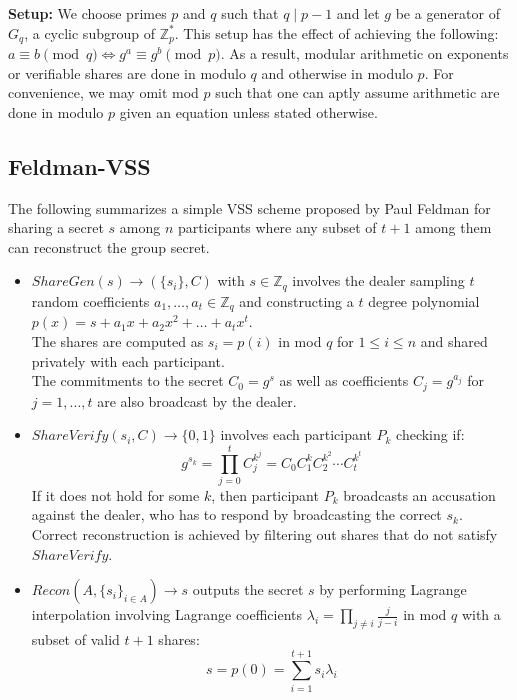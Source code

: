 \documentclass[letterpaper,twocolumn,10pt]{article}
\theoremstyle{definition}
\theoremstyle{remark}
\begin{document}
\textbf{Setup:} We choose primes $p$ and $q$ such that $q \mid p - 1$ and let $g$ be a generator of $G_q$, a cyclic subgroup of $\mathbb{Z}^*_p$. This setup has the effect of achieving the following: $a \equiv b \pmod q \iff g^a \equiv g^b \pmod p$. As a result, modular arithmetic on exponents or verifiable shares are done in modulo $q$ and otherwise in modulo $p$. For convenience, we may omit mod $p$ such that one can aptly assume arithmetic are done in modulo $p$ given an equation unless stated otherwise.
\subsection{Feldman-VSS}
\label{appendix:feldmanVSS}
The following summarizes a simple VSS scheme proposed by Paul Feldman for sharing a secret $s$ among $n$ participants where any subset of $t+1$ among them can reconstruct the group secret.
\begin{itemize}
    \item $ShareGen(s) \rightarrow (\{s_i\}, C)$ with $s \in \mathbb{Z}_q$ involves the dealer sampling $t$ random coefficients $a_1, \ldots, a_t \in \mathbb{Z}_q$ and constructing a $t$ degree polynomial $p(x) = s + a_1x+ a_2x^2 +\ldots+a_tx^t$.\\
    The shares are computed as $s_i = p(i)$ in mod $q$ for $1\le i \le n$ and shared privately with each participant.\\
    The commitments to the secret $C_0 = g^s$ as well as coefficients $C_j = g^{a_j}$ for $j = 1,\ldots,t$ are also broadcast by the dealer.
    
    \item $ShareVerify(s_i, C) \rightarrow \{0, 1\}$ involves each participant $P_k$  checking if:
    $$g^{s_k} = \prod_{j = 0}^{t } C_j^{k^j} = C_0 C_1^k C_2^{k^2} \cdots C_{t }^{k^{t }}$$
     If it does not hold for some $k$, then participant $P_k$ broadcasts an accusation against the dealer, who has to respond by broadcasting the correct $s_k$. \\
     Correct reconstruction is achieved by filtering out shares that do not satisfy $ShareVerify$.
    \item $Recon(A, \{s_i\}_{i \in A}) \rightarrow s$ outputs the secret $s$ by performing  Lagrange interpolation involving Lagrange coefficients $\lambda_i = \prod_{j \neq i} \frac{j}{j - i}$ in mod $q$ with a subset of valid $t+1$ shares:
    $$s = p(0) = \sum_{i = 1}^{t+1} s_i \lambda_i$$
\end{itemize}
\end{document}

